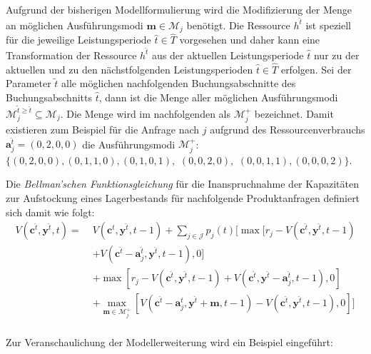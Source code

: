 Aufgrund der bisherigen Modellformulierung wird die Modifizierung der Menge an möglichen Ausführungsmodi $\textbf{m}\in\mathcal{M}_{j}$ benötigt. Die Ressource $h^{\hat{t}}$ ist speziell für die jeweilige Leistungsperiode $\hat{t}\in \hat{T}$ vorgesehen und daher kann eine Transformation der Ressource $h^{\hat{t}}$ aus der aktuellen Leistungsperiode $\hat{t}$ nur zu der aktuellen und zu den nächstfolgenden Leistungsperioden $\hat{t}\in \hat{T}$ erfolgen. Sei der Parameter $\tilde{t}$ alle möglichen nachfolgenden Buchungsabschnitte des Buchungsabschnitts $\hat{t}$, dann ist die Menge aller möglichen Ausführungsmodi $\mathcal{M}_{j}^{\tilde{t}\ge \hat{t}}\subseteq\mathcal{M}_j$. Die Menge wird im nachfolgenden als $\mathcal{M}_{j}^{+}$ bezeichnet. Damit existieren zum Beispiel für die Anfrage nach $j$ aufgrund des Ressourcenverbrauchs $\textbf{a}_{j}^{\hat{t}}=(0,2,0,0)$ die Ausführungsmodi $\mathcal{M}_{j}^{+}$: $\{ (0 ,2, 0, 0), (0, 1, 1, 0), (0, 1, 0, 1),$ $(0, 0, 2, 0),$ $(0, 0, 1, 1), (0, 0, 0, 2)\}$. 

Die \textit{Bellman'schen Funktionsgleichung} für die Inanspruchnahme der Kapazitäten zur Aufstockung eines Lagerbestands für nachfolgende Produktanfragen definiert sich damit wie folgt:
\begin{equation}\label{time}
\begin{alignat*}{2}
V(\textbf{c}^{\hat{t}}, \textbf{y}^{\hat{t}}, t) = \;& V(\textbf{c}^{\hat{t}}, \textbf{y}^{\hat{t}}, t-1)+ \sum_{j \in \mathcal{J}}p_{j}(t)[\max[r_{j} - V(\textbf{c}^{\hat{t}}, \textbf{y}^{\hat{t}}, t-1)\\
&+ V(\textbf{c}^{\hat{t}}-\textbf{a}^{\hat{t}}_j, \textbf{y}^{\hat{t}}, t-1),0] \\
&+ \max[r_{j} - V(\textbf{c}^{\hat{t}}, \textbf{y}^{\hat{t}}, t-1) + V(\textbf{c}^{\hat{t}}, \textbf{y}^{\hat{t}}-\textbf{a}_j^{\hat{t}}, t-1),0]\\
&+ \max_{\textbf{m}\in\mathcal{M}_{j}^{+}}[V(\textbf{c}^{\hat{t}}-\textbf{a}^{\hat{t}}_j, \textbf{y}^{\hat{t}}+\textbf{m}, t-1) - V(\textbf{c}^{\hat{t}}, \textbf{y}^{\hat{t}}, t-1) ,0]]\\
\end{alignat*}
\end{equation}


Zur Veranschaulichung der Modellerweiterung wird ein Beispiel eingeführt:

